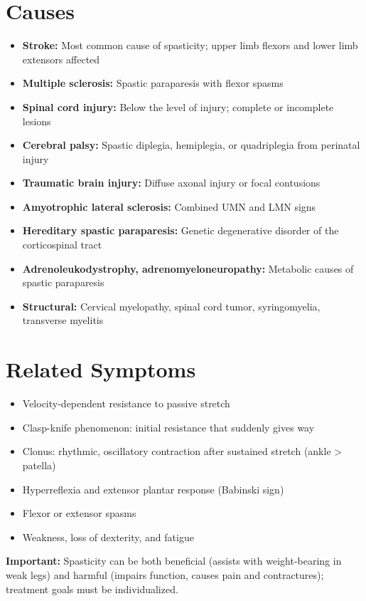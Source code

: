 \section*{Causes}
\begin{itemize}
  \item \textbf{Stroke:} Most common cause of spasticity; upper limb flexors and lower limb extensors affected
  \item \textbf{Multiple sclerosis:} Spastic paraparesis with flexor spasms
  \item \textbf{Spinal cord injury:} Below the level of injury; complete or incomplete lesions
  \item \textbf{Cerebral palsy:} Spastic diplegia, hemiplegia, or quadriplegia from perinatal injury
  \item \textbf{Traumatic brain injury:} Diffuse axonal injury or focal contusions
  \item \textbf{Amyotrophic lateral sclerosis:} Combined UMN and LMN signs
  \item \textbf{Hereditary spastic paraparesis:} Genetic degenerative disorder of the corticospinal tract
  \item \textbf{Adrenoleukodystrophy, adrenomyeloneuropathy:} Metabolic causes of spastic paraparesis
  \item \textbf{Structural:} Cervical myelopathy, spinal cord tumor, syringomyelia, transverse myelitis
\end{itemize}

\section*{Related Symptoms}
\begin{itemize}
  \item Velocity-dependent resistance to passive stretch
  \item Clasp-knife phenomenon: initial resistance that suddenly gives way
  \item Clonus: rhythmic, oscillatory contraction after sustained stretch (ankle > patella)
  \item Hyperreflexia and extensor plantar response (Babinski sign)
  \item Flexor or extensor spasms
  \item Weakness, loss of dexterity, and fatigue
\end{itemize}
\textbf{Important:} Spasticity can be both beneficial (assists with weight-bearing in weak legs) and harmful (impairs function, causes pain and contractures); treatment goals must be individualized.

